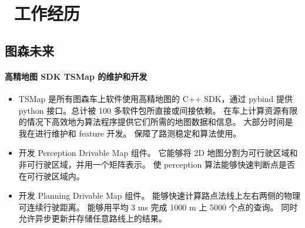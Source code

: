 \section{\faUsers\ 工作经历}


\subsection{图森未来}
    \paragraph{高精地图 SDK TSMap 的维护和开发}
        \begin{itemize}
            \item 
                TSMap 是所有图森车上软件使用高精地图的 C++ SDK，通过 pybind 提供 python 接口。总计被 100 多软件包所直接或间接依赖。
                在车上计算资源有限的情况下高效地为算法程序提供它们所需的地图数据和信息。
                大部分时间是我在进行维护和 feature 开发。
                保障了路测稳定和算法使用。
            \item 
                开发 Perception Drivable Map 组件。
                它能够将 2D 地图分割为可行驶区域和非可行驶区域，并用一个矩阵表示。
                使 perception 算法能够快速判断点是否在可行驶区域内。
            \item 
                开发 Planning Drivable Map 组件。
                能够快速计算路点法线上左右两侧的物理可连续行驶距离。
                能够用平均 3 ms 完成 1000 m 上 5000 个点的查询。
                同时允许异步更新并存储任意路线上的结果。
        \end{itemize}

